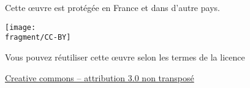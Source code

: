 \begin{minipage}{\textwidth}
  \centering\footnotesize
  Cette œuvre est protégée en France et dans d'autre pays.
  
  \bigskip

  \texttt{[image: \\fragment/CC-BY]}
    
  \bigskip

  Vous pouvez réutiliser cette œuvre selon les termes de la licence

  \href{https://creativecommons.org/licenses/by/3.0/deed.fr}{%
    Creative commons -- attribution 3.0 non transposé}
\end{minipage}


